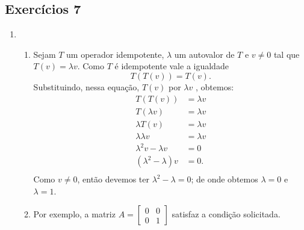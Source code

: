 \subsection{ \textbf{Exercícios 7}}
\begin{enumerate}
\item
\begin{enumerate}[label=(\alph*)]
\item  Sejam $T$ um operador idempotente, $\lambda$ um autovalor de $T$ e $v \neq 0$ tal que $T(v)=\lambda v$. Como $T$ é idempotente vale a igualdade $$T(T(v))=T(v).$$  Substituindo, nessa equação,  $T(v)$ por $\lambda v$ , obtemos:
\begin{align*}
T(T(v))&=\lambda v\\
T(\lambda v)&=\lambda v\\
\lambda T( v)&=\lambda v\\
\lambda \lambda v&=\lambda v\\
\lambda^2v -\lambda v&=0\\
(\lambda^2 -\lambda )v&=0.\\
\end{align*}
Como $ v \neq 0$, então devemos ter  $\lambda^2 -\lambda =0$; de onde obtemos $\lambda=0$ e $\lambda=1$.
\item Por exemplo, a matriz $A= \begin{bmatrix}
0 & 0\\
0& 1\end{bmatrix}$ satisfaz a condição solicitada.
\end{enumerate}


\end{enumerate}
